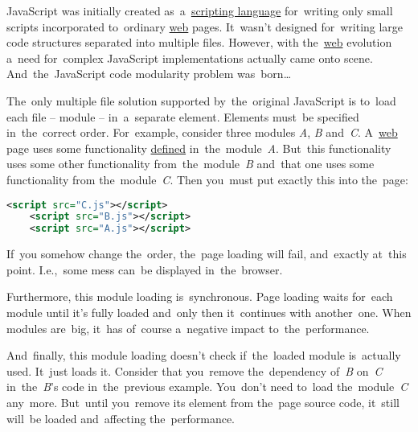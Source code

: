 \label{javascriptmodularity}
JavaScript was initially created as~a~\hyperref[scriptinglanguages]{scripting language} for~writing only small scripts incorporated to~ordinary \hyperref[internetweb]{web} pages.
It~wasn't designed for~writing large code structures separated into multiple files.
However, with the~\hyperref[internetweb]{web} evolution a~need for~complex JavaScript implementations actually came onto scene.
And~the~JavaScript code modularity problem was~born\dots

The~only multiple file solution supported by~the~original JavaScript is to~load each file -- module --  in~a~separate  element.
Elements must~be specified in~the~correct order.
For~example, consider three modules \textit{A}, \textit{B} and~\textit{C}.
A~\hyperref[internetweb]{web} page uses some functionality \hyperref[declarationdefinition]{defined} in~the~module~\textit{A}.
But~this functionality uses some other functionality from~the~module~\textit{B} and~that one uses some functionality from the~module~\textit{C}.
Then you~must put exactly this into the~page:

\begin{lstlisting}[language=XML,frame=no]
    <script src="C.js"></script>
    <script src="B.js"></script>
    <script src="A.js"></script>
\end{lstlisting}

\noindent If~you somehow change the~order, the~page loading will fail, and~exactly at~this point.
I.e.,~some mess can~be displayed in~the~browser.

Furthermore, this module loading is~synchronous.
Page loading waits for~each module until it's fully loaded and~only then it~continues with another~one.
When modules are~big, it~has of~course a~negative impact to~the~performance.

And~finally, this module loading doesn't check if~the~loaded module is~actually used.
It~just loads it.
Consider that you~remove the~dependency of~\textit{B} on~\textit{C} in~the~\textit{B}'s code in~the~previous example.
You~don't need to~load the~module~\textit{C} any~more.
But~until you~remove its  element from the~page source code, it~still will~be loaded and~affecting the~performance.
